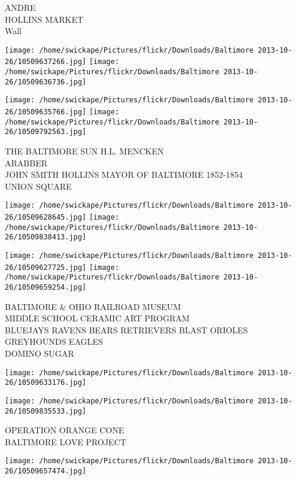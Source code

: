 \documentclass[10pt,letterpaper]{article}
\begin{document}
ANDRE\\
HOLLINS MARKET\\
Wall\\
\pagebreak

\texttt{[image: /home/swickape/Pictures/flickr/Downloads/Baltimore 2013-10-26/10509637266.jpg]}
\texttt{[image: /home/swickape/Pictures/flickr/Downloads/Baltimore 2013-10-26/10509636736.jpg]}

\texttt{[image: /home/swickape/Pictures/flickr/Downloads/Baltimore 2013-10-26/10509635766.jpg]}
\texttt{[image: /home/swickape/Pictures/flickr/Downloads/Baltimore 2013-10-26/10509792563.jpg]}

THE BALTIMORE SUN H.L. MENCKEN\\
ARABBER\\
JOHN SMITH HOLLINS MAYOR OF BALTIMORE 1852{-}1854\\
UNION SQUARE\\
\pagebreak

\texttt{[image: /home/swickape/Pictures/flickr/Downloads/Baltimore 2013-10-26/10509628645.jpg]}
\texttt{[image: /home/swickape/Pictures/flickr/Downloads/Baltimore 2013-10-26/10509838413.jpg]}

\texttt{[image: /home/swickape/Pictures/flickr/Downloads/Baltimore 2013-10-26/10509627725.jpg]}
\texttt{[image: /home/swickape/Pictures/flickr/Downloads/Baltimore 2013-10-26/10509659254.jpg]}

BALTIMORE \& OHIO RAILROAD MUSEUM\\
MIDDLE SCHOOL CERAMIC ART PROGRAM\\
BLUEJAYS RAVENS BEARS RETRIEVERS BLAST ORIOLES GREYHOUNDS EAGLES\\
DOMINO SUGAR\\
\pagebreak

\texttt{[image: /home/swickape/Pictures/flickr/Downloads/Baltimore 2013-10-26/10509633176.jpg]}

\vspace{0.25in}
\texttt{[image: /home/swickape/Pictures/flickr/Downloads/Baltimore 2013-10-26/10509835533.jpg]}

OPERATION ORANGE CONE\\
BALTIMORE LOVE PROJECT\\
\pagebreak

\texttt{[image: /home/swickape/Pictures/flickr/Downloads/Baltimore 2013-10-26/10509657474.jpg]}
\end{document}
